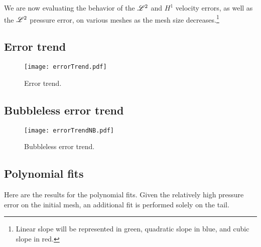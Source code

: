 We are now evaluating the behavior of the $\mathscr{L}^2$ and $H^1$ velocity errors, as well as the $\mathscr{L}^2$ pressure error, on various meshes as the mesh size decreases.\footnote{Linear slope will be represented in \textcolor{solarized-green}{green}, quadratic slope in \textcolor{solarized-blue}{blue}, and cubic slope in \textcolor{solarized-red}{red}.}

\subsection{Error trend}

\begin{figure}[!ht]
	\centering
	\texttt{[image: errorTrend.pdf]}
	\caption{Error trend.}
\end{figure}

\newpage
\subsection{Bubbleless error trend}

\begin{figure}[!ht]
	\centering
	\texttt{[image: errorTrendNB.pdf]}
	\caption{Bubbleless error trend.}
\end{figure}

\newpage
\subsection{Polynomial fits}

Here are the results for the polynomial fits. Given the relatively high pressure error on the initial mesh, an additional fit is performed solely on the tail. 


